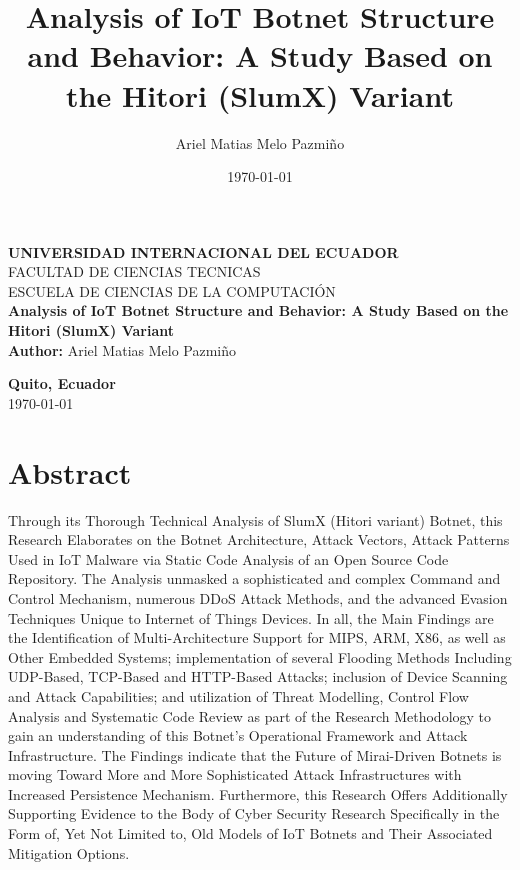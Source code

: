 \documentclass[12pt,letterpaper]{report}
\title{Analysis of IoT Botnet Structure and Behavior: A Study Based on the Hitori (SlumX) Variant}
\author{Ariel Matias Melo Pazmiño}
\date{\today}
\begin{document}
\begin{titlepage}
    \centering
    \vspace*{2cm}
    
    {\LARGE \textbf{UNIVERSIDAD INTERNACIONAL DEL ECUADOR}}\\[0.5cm]
    {\large FACULTAD DE CIENCIAS TECNICAS}\\[0.5cm]
    {\large ESCUELA DE CIENCIAS DE LA COMPUTACIÓN}\\[2cm]
    
    {\huge \textbf{Analysis of IoT Botnet Structure and Behavior: A Study Based on the Hitori (SlumX) Variant}}\\[2cm]

    \textbf{Author:} Ariel Matias Melo Pazmiño\\[0.5cm]

    \vfill
    
    {\large \textbf{Quito, Ecuador}}\\
    {\large \today}
    
\end{titlepage}
\setcounter{page}{1}

\chapter*{Abstract}

Through its Thorough Technical Analysis of SlumX (Hitori variant) Botnet, this Research Elaborates on the Botnet Architecture, Attack Vectors, Attack Patterns Used in IoT Malware via Static Code Analysis of an Open Source Code Repository. The Analysis unmasked a sophisticated and complex Command and Control Mechanism, numerous DDoS Attack Methods, and the advanced Evasion Techniques Unique to Internet of Things Devices. In all, the Main Findings are the Identification of Multi-Architecture Support for MIPS, ARM, X86, as well as Other Embedded Systems; implementation of several Flooding Methods Including UDP-Based, TCP-Based and HTTP-Based Attacks; inclusion of Device Scanning and Attack Capabilities; and utilization of Threat Modelling, Control Flow Analysis and Systematic Code Review as part of the Research Methodology to gain an understanding of this Botnet's Operational Framework and Attack Infrastructure. The Findings indicate that the Future of Mirai-Driven Botnets is moving Toward More and More Sophisticated Attack Infrastructures with Increased Persistence Mechanism. Furthermore, this Research Offers Additionally Supporting Evidence to the Body of Cyber Security Research Specifically in the Form of, Yet Not Limited to, Old Models of IoT Botnets and Their Associated Mitigation Options.
\end{document}

